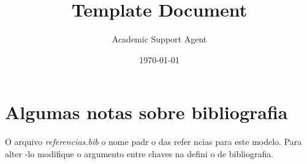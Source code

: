 \documentclass{article}
\title{Template Document}
\author{Academic Support Agent}
\date{\today}
\begin{document}
\maketitle

\pretextual  %









%
\geraintro  %

\chapter{Algumas notas sobre bibliografia}


\par O arquivo \textit{referencias.bib}   o nome padr o das refer ncias para este modelo. Para alter -lo modifique o argumento entre chaves na defini o de bibliografia.
\end{document}

